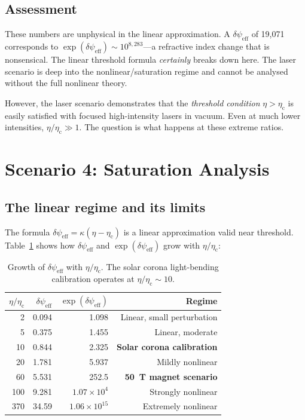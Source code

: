 \documentclass[12pt,a4paper]{article}
\newcommand{\psieff}{\psi_{\mathrm{eff}}}
\newcommand{\etac}{\eta_{\mathrm{c}}}
\begin{document}
\subsection{Assessment}

These numbers are unphysical in the linear approximation. A $\delta\psieff$ of 19,071 corresponds to
$\exp(\delta\psieff) \sim 10^{8{,}283}$---a refractive index change that is nonsensical. The linear
threshold formula \emph{certainly} breaks down here. The laser scenario is deep into the nonlinear/saturation
regime and cannot be analysed without the full nonlinear theory.

However, the laser scenario demonstrates that the \emph{threshold condition} $\eta > \etac$ is easily
satisfied with focused high-intensity lasers in vacuum. Even at much lower intensities, $\eta/\etac \gg 1$.
The question is what happens at these extreme ratios.

\section{Scenario 4: Saturation Analysis}
\label{sec:saturation}

\subsection{The linear regime and its limits}

The formula $\delta\psieff = \kappa(\eta - \etac)$ is a linear approximation valid near threshold.
Table~\ref{tab:saturation} shows how $\delta\psieff$ and $\exp(\delta\psieff)$ grow with $\eta/\etac$:

\begin{table}[H]
\centering
\begin{tabular}{rrrr}
\toprule
$\eta/\etac$ & $\delta\psieff$ & $\exp(\delta\psieff)$ & Regime \\
\midrule
2   & 0.094  & 1.098     & Linear, small perturbation \\
5   & 0.375  & 1.455     & Linear, moderate \\
10  & 0.844  & 2.325     & \textbf{Solar corona calibration} \\
20  & 1.781  & 5.937     & Mildly nonlinear \\
60  & 5.531  & 252.5     & \textbf{50~T magnet scenario} \\
100 & 9.281  & $1.07 \times 10^4$ & Strongly nonlinear \\
370 & 34.59  & $1.06 \times 10^{15}$ & Extremely nonlinear \\
\bottomrule
\end{tabular}
\caption{Growth of $\delta\psieff$ with $\eta/\etac$. The solar corona light-bending calibration
operates at $\eta/\etac \sim 10$.}
\label{tab:saturation}
\end{table}
\end{document}
